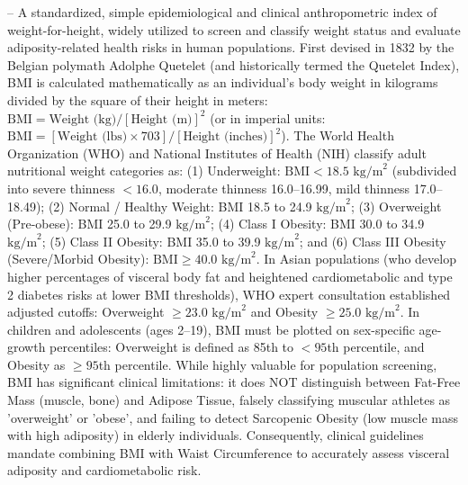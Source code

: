 -- A standardized, simple epidemiological and clinical anthropometric index of weight-for-height, widely utilized to screen and classify weight status and evaluate adiposity-related health risks in human populations. First devised in 1832 by the Belgian polymath Adolphe Quetelet (and historically termed the Quetelet Index), BMI is calculated mathematically as an individual's body weight in kilograms divided by the square of their height in meters: $\text{BMI} = \text{Weight (kg)} / [\text{Height (m)}]^2$ (or in imperial units: $\text{BMI} = [\text{Weight (lbs)} \times 703] / [\text{Height (inches)}]^2$). The World Health Organization (WHO) and National Institutes of Health (NIH) classify adult nutritional weight categories as: (1) Underweight: $\text{BMI} < 18.5\text{ kg/m}^2$ (subdivided into severe thinness $<16.0$, moderate thinness 16.0--16.99, mild thinness 17.0--18.49); (2) Normal / Healthy Weight: BMI 18.5 to 24.9 $\text{kg/m}^2$; (3) Overweight (Pre-obese): BMI 25.0 to 29.9 $\text{kg/m}^2$; (4) Class I Obesity: BMI 30.0 to 34.9 $\text{kg/m}^2$; (5) Class II Obesity: BMI 35.0 to 39.9 $\text{kg/m}^2$; and (6) Class III Obesity (Severe/Morbid Obesity): $\text{BMI} \ge 40.0\text{ kg/m}^2$. In Asian populations (who develop higher percentages of visceral body fat and heightened cardiometabolic and type 2 diabetes risks at lower BMI thresholds), WHO expert consultation established adjusted cutoffs: Overweight $\ge 23.0\text{ kg/m}^2$ and Obesity $\ge 25.0\text{ kg/m}^2$. In children and adolescents (ages 2--19), BMI must be plotted on sex-specific age-growth percentiles: Overweight is defined as 85th to $<95$th percentile, and Obesity as $\ge 95$th percentile. While highly valuable for population screening, BMI has significant clinical limitations: it does NOT distinguish between Fat-Free Mass (muscle, bone) and Adipose Tissue, falsely classifying muscular athletes as 'overweight' or 'obese', and failing to detect Sarcopenic Obesity (low muscle mass with high adiposity) in elderly individuals. Consequently, clinical guidelines mandate combining BMI with Waist Circumference to accurately assess visceral adiposity and cardiometabolic risk.


